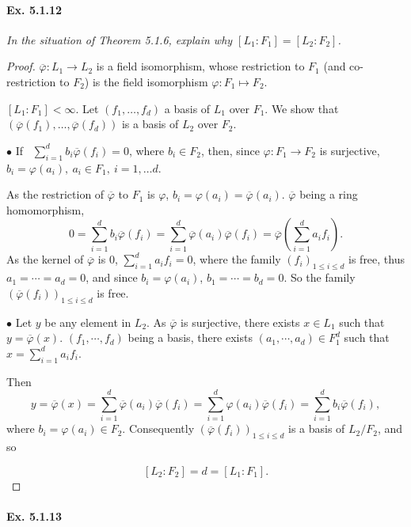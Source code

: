 \documentclass[11pt,a4paper]{article}
\begin{document}
\paragraph{Ex. 5.1.12}

{\it In the situation of Theorem 5.1.6, explain why $[L_1:F_1] = [L_2:F_2]$.
}

\begin{proof}
$\overline{\varphi} : L_1\to L_2$ is a field isomorphism, whose restriction to  $F_1$ (and co-restriction to $F_2$) is the field isomorphism $\varphi : F_1\mapsto F_2$.

$[L_1:F_1] < \infty$. Let $(f_1,\ldots,f_d)$ a basis of $L_1$ over $F_1$. We show that $(\overline{\varphi}(f_1), \ldots,\overline{\varphi}(f_d))$ is a basis of $L_2$ over $F_2$.

{\medskip}

$\bullet$ If \ $\sum_{i=1}^d b_i \overline{\varphi}(f_i) = 0$, where $b_i \in F_2$, then, since $\varphi : F_1\to F_2$ is surjective, ${b_i = \varphi(a_i)}, \ a_i \in F_1, \ i=1,\ldots d$.

As the restriction of $\overline{\varphi}$ to $F_1$ is $\varphi$, $b_i =\varphi(a_i) =  \overline{\varphi}(a_i)$. $\overline{\varphi}$ being a ring homomorphism,
$$0= \sum_{i=1}^d b_i \overline{\varphi}(f_i) = \sum_{i=1}^d \overline{\varphi}(a_i) \overline{\varphi}(f_i) = \overline{\varphi}\left (\sum_{i=1}^d a_i f_i\right).$$
As the kernel of $\overline{\varphi}$ is $0$, $\sum_{i=1}^d a_i f_i =0$, where the family $(f_i)_{1\leq i \leq d}$ is free, thus $a_1=\cdots=a_d=0$, and since $b_i = \varphi(a_i)$, $b_1=\cdots=b_d=0$. So the family $(\overline{\varphi}(f_i))_{1\leq i \leq d}$ is free.

{\medskip}

 $\bullet$ Let $y $ be any element in $L_2$. As $\overline{\varphi}$ is surjective, there exists $x\in L_1$ such that $y =\overline{\varphi}(x)$.
 $(f_1,\cdots,f_d)$ being a basis, there exists $(a_1,\cdots,a_d) \in F_1^d$ such that  $x = \sum_{i=1}^d a_i f_i$.
 
 Then $$y = \overline{\varphi}(x) = \sum_{i=1}^d \overline{\varphi}(a_i) \overline{\varphi}(f_i) =  \sum_{i=1}^d \varphi(a_i) \overline{\varphi}(f_i) =  \sum_{i=1}^d b_i\overline{\varphi}(f_i),$$
where $b_i = \varphi(a_i) \in F_2$. Consequently $(\overline{\varphi}(f_i))_{1\leq i \leq d}$ is a basis of $L_2/F_2$, and so
 
$$[L_2:F_2] = d =[L_1:F_1].$$
\end{proof}

\paragraph{Ex. 5.1.13}
\end{document}

